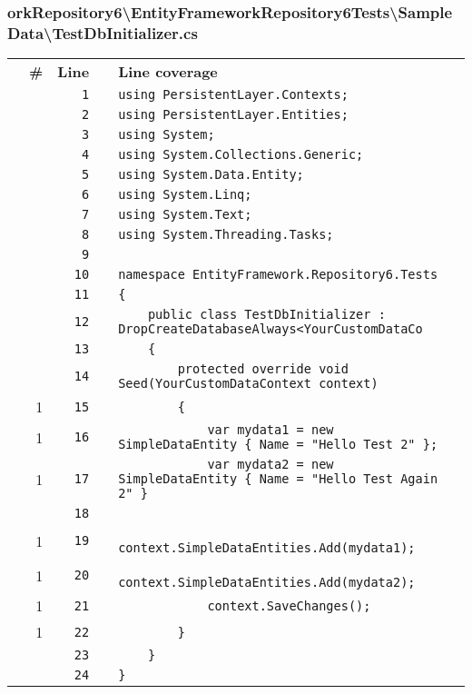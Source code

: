 \documentclass[a4paper,10pt]{article}
\begin{document}
\subsubsection{orkRepository6\textbackslash EntityFrameworkRepository6Tests\textbackslash SampleData\textbackslash TestDbInitializer.cs}
\begin{longtable}[l]{lrrll}
\textbf{} & \textbf{\#} & \textbf{Line} & \textbf{} & \textbf{Line coverage}\\
\cellcolor{gray} &  & \verb~1~ & & \verb~using PersistentLayer.Contexts;~\\
\cellcolor{gray} &  & \verb~2~ & & \verb~using PersistentLayer.Entities;~\\
\cellcolor{gray} &  & \verb~3~ & & \verb~using System;~\\
\cellcolor{gray} &  & \verb~4~ & & \verb~using System.Collections.Generic;~\\
\cellcolor{gray} &  & \verb~5~ & & \verb~using System.Data.Entity;~\\
\cellcolor{gray} &  & \verb~6~ & & \verb~using System.Linq;~\\
\cellcolor{gray} &  & \verb~7~ & & \verb~using System.Text;~\\
\cellcolor{gray} &  & \verb~8~ & & \verb~using System.Threading.Tasks;~\\
\cellcolor{gray} &  & \verb~9~ & & \verb~~\\
\cellcolor{gray} &  & \verb~10~ & & \verb~namespace EntityFramework.Repository6.Tests~\\
\cellcolor{gray} &  & \verb~11~ & & \verb~{~\\
\cellcolor{gray} &  & \verb~12~ & & \verb~    public class TestDbInitializer : DropCreateDatabaseAlways<YourCustomDataCo~\\
\cellcolor{gray} &  & \verb~13~ & & \verb~    {~\\
\cellcolor{gray} &  & \verb~14~ & & \verb~        protected override void Seed(YourCustomDataContext context)~\\
\cellcolor{green} & 1 & \verb~15~ & & \verb~        {~\\
\cellcolor{green} & 1 & \verb~16~ & & \verb~            var mydata1 = new SimpleDataEntity { Name = "Hello Test 2" };~\\
\cellcolor{green} & 1 & \verb~17~ & & \verb~            var mydata2 = new SimpleDataEntity { Name = "Hello Test Again 2" }~\\
\cellcolor{gray} &  & \verb~18~ & & \verb~~\\
\cellcolor{green} & 1 & \verb~19~ & & \verb~            context.SimpleDataEntities.Add(mydata1);~\\
\cellcolor{green} & 1 & \verb~20~ & & \verb~            context.SimpleDataEntities.Add(mydata2);~\\
\cellcolor{green} & 1 & \verb~21~ & & \verb~            context.SaveChanges();~\\
\cellcolor{green} & 1 & \verb~22~ & & \verb~        }~\\
\cellcolor{gray} &  & \verb~23~ & & \verb~    }~\\
\cellcolor{gray} &  & \verb~24~ & & \verb~}~\\
\end{longtable}
\newpage
\end{document}
